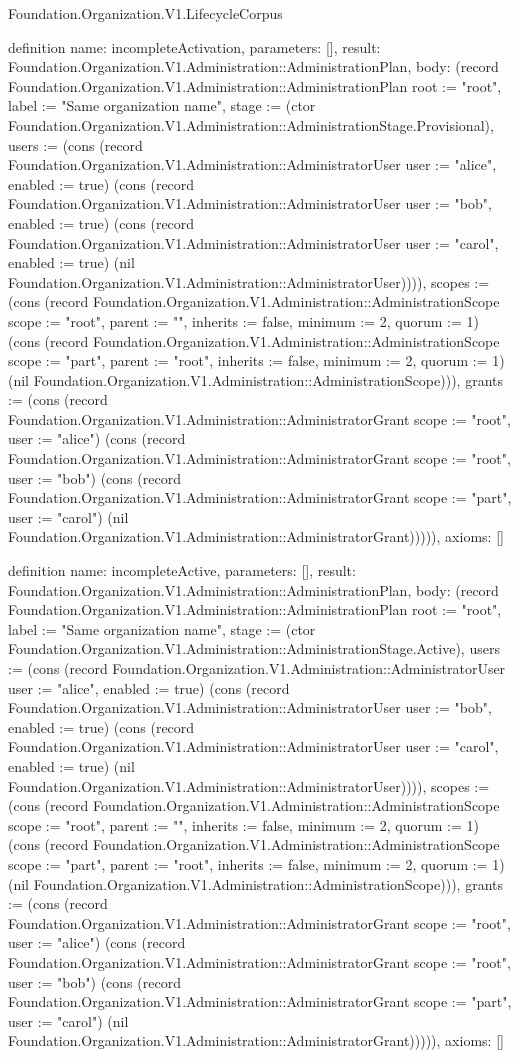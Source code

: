 \begin{lexlean}{Foundation.Organization.V1.LifecycleCorpus}
\begin{semanticmodule}
definition{
  name: incompleteActivation,
  parameters: [],
  result: Foundation.Organization.V1.Administration::AdministrationPlan,
  body: (record Foundation.Organization.V1.Administration::AdministrationPlan {root := "root", label := "Same organization name", stage := (ctor Foundation.Organization.V1.Administration::AdministrationStage.Provisional), users := (cons (record Foundation.Organization.V1.Administration::AdministratorUser {user := "alice", enabled := true}) (cons (record Foundation.Organization.V1.Administration::AdministratorUser {user := "bob", enabled := true}) (cons (record Foundation.Organization.V1.Administration::AdministratorUser {user := "carol", enabled := true}) (nil Foundation.Organization.V1.Administration::AdministratorUser)))), scopes := (cons (record Foundation.Organization.V1.Administration::AdministrationScope {scope := "root", parent := "", inherits := false, minimum := 2, quorum := 1}) (cons (record Foundation.Organization.V1.Administration::AdministrationScope {scope := "part", parent := "root", inherits := false, minimum := 2, quorum := 1}) (nil Foundation.Organization.V1.Administration::AdministrationScope))), grants := (cons (record Foundation.Organization.V1.Administration::AdministratorGrant {scope := "root", user := "alice"}) (cons (record Foundation.Organization.V1.Administration::AdministratorGrant {scope := "root", user := "bob"}) (cons (record Foundation.Organization.V1.Administration::AdministratorGrant {scope := "part", user := "carol"}) (nil Foundation.Organization.V1.Administration::AdministratorGrant))))}),
  axioms: []
}

definition{
  name: incompleteActive,
  parameters: [],
  result: Foundation.Organization.V1.Administration::AdministrationPlan,
  body: (record Foundation.Organization.V1.Administration::AdministrationPlan {root := "root", label := "Same organization name", stage := (ctor Foundation.Organization.V1.Administration::AdministrationStage.Active), users := (cons (record Foundation.Organization.V1.Administration::AdministratorUser {user := "alice", enabled := true}) (cons (record Foundation.Organization.V1.Administration::AdministratorUser {user := "bob", enabled := true}) (cons (record Foundation.Organization.V1.Administration::AdministratorUser {user := "carol", enabled := true}) (nil Foundation.Organization.V1.Administration::AdministratorUser)))), scopes := (cons (record Foundation.Organization.V1.Administration::AdministrationScope {scope := "root", parent := "", inherits := false, minimum := 2, quorum := 1}) (cons (record Foundation.Organization.V1.Administration::AdministrationScope {scope := "part", parent := "root", inherits := false, minimum := 2, quorum := 1}) (nil Foundation.Organization.V1.Administration::AdministrationScope))), grants := (cons (record Foundation.Organization.V1.Administration::AdministratorGrant {scope := "root", user := "alice"}) (cons (record Foundation.Organization.V1.Administration::AdministratorGrant {scope := "root", user := "bob"}) (cons (record Foundation.Organization.V1.Administration::AdministratorGrant {scope := "part", user := "carol"}) (nil Foundation.Organization.V1.Administration::AdministratorGrant))))}),
  axioms: []
}


\end{semanticmodule}
\end{lexlean}
